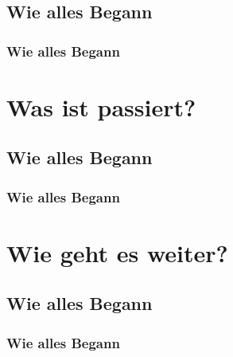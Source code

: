\documentclass{beamer}
\begin{document}
\subsection{Wie alles Begann}
\begin{frame}\frametitle{Wie alles Begann} 
\end{frame}

\section{Was ist passiert?}
\subsection{Wie alles Begann}
\begin{frame}\frametitle{Wie alles Begann} 
\end{frame}

\section{Wie geht es weiter?}
\subsection{Wie alles Begann}
\begin{frame}\frametitle{Wie alles Begann} 
\end{frame}
%
\end{document}
